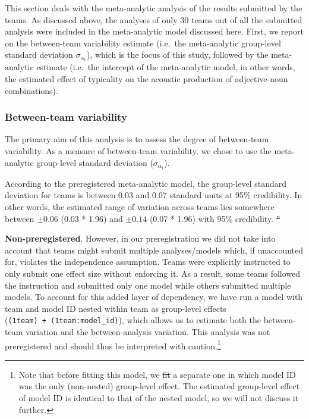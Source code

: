 \documentclass[Review,times,sageh]{sagej}
\providecommand{\DIFaddtex}[1]{{\protect\color{blue}\uwave{#1}}} %
\providecommand{\DIFdeltex}[1]{{\protect\color{red}\sout{#1}}}                      %
\providecommand{\DIFaddbegin}{} %
\providecommand{\DIFaddend}{} %
\providecommand{\DIFdelbegin}{} %
\providecommand{\DIFdelend}{} %
\providecommand{\DIFadd}[1]{\texorpdfstring{\DIFaddtex{#1}}{#1}} %
\providecommand{\DIFdel}[1]{\texorpdfstring{\DIFdeltex{#1}}{}} %
\begin{document}
This section deals with the meta-analytic analysis of the results submitted by the teams.
As discussed above, the analyses of only 30 teams out of all the submitted analysis were included in the meta-analytic model discussed here.
First, we report on the between-team variability estimate (i.e.~the meta-analytic group-level standard deviation \(\sigma_{\alpha_{\text{t}}}\)), which is the focus of this study, followed by the meta-analytic estimate (i.e.~the intercept of the meta-analytic model, in other words, the estimated effect of typicality on the acoustic production of adjective-noun combinations).

\hypertarget{between-team-variability}{%
\subsubsection{Between-team variability}\label{between-team-variability}}

The primary aim of this analysis is to assess the degree of between-team variability.
As a measure of between-team variability, we chose to use the meta-analytic group-level standard deviation (\(\sigma_{\alpha_{\text{t}}}\)).

According to the preregistered meta-analytic model, the group-level standard deviation for teams is between 0.03 and 0.07 standard units at 95\% credibility.
In other words, the estimated range of variation across teams lies somewhere between \(\pm 0.06\) (0.03 * 1.96) and \DIFdelbegin \DIFdel{\(\pm 0.14\) }\DIFdelend \DIFaddbegin \DIFadd{\(\pm 0.13\) }\DIFaddend (0.07 * 1.96) \DIFaddbegin \DIFadd{standard units }\DIFaddend with 95\% credibility.
\DIFdelbegin \DIFdel{''
}\DIFdelend 

\textbf{Non-preregistered}. However, in our preregistration we did not take into account that teams might submit multiple analyses/models which, if unaccounted for, violates the independence assumption.
Teams were explicitly instructed to only submit one effect size without enforcing it.
As a result, some teams followed the instruction and submitted only one model while others submitted multiple models.
To account for this added layer of dependency, we have run a model with team and model ID nested within team as group-level effects (\texttt{(1\textbar{}team)\ +\ (1\textbar{}team:model\_id)}), which allows us to estimate both the between-team variation and the between-analysis variation.
This analysis was not preregistered and should thus be interpreted with caution.\footnote{Note that before fitting this model, we \DIFdelbegin \DIFdel{fit }\DIFdelend \DIFaddbegin \DIFadd{fitted }\DIFaddend a separate one in which model ID was the only (non-nested) group-level effect.
  The estimated group-level effect of model ID is identical to that of the nested model, so we will not discuss it further.}
\end{document}
